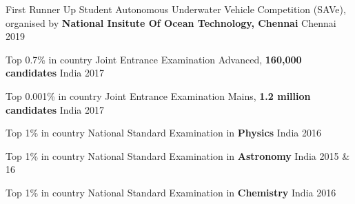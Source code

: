 
\begin{cvhonors}
  \cvhonor
    {First Runner Up}
    {Student Autonomous Underwater Vehicle Competition (SAVe), \break organised by\textbf{ National Insitute Of Ocean Technology, Chennai}} 
    {Chennai} 
    {2019}
 
  \cvhonor
    {Top 0.7\% in country}
    {Joint Entrance Examination Advanced, \textbf{160,000 candidates}} 
    {India} 
    {2017}

  \cvhonor
    {Top 0.001\% in country} 
    {Joint Entrance Examination Mains, \textbf{1.2 million candidates}} 
    {India}
    {2017}

 \cvhonor
    {Top 1\% in country} 
    {National Standard Examination in \textbf{Physics}}
    {India}
    {2016}
 
 \cvhonor
    {Top 1\% in country} 
    {National Standard Examination in \textbf{Astronomy}}
    {India}
    {2015 \& 16}
  
  \cvhonor
    {Top 1\% in country} 
    {National Standard Examination in \textbf{Chemistry}}
    {India}
    {2016}
 
\end{cvhonors}